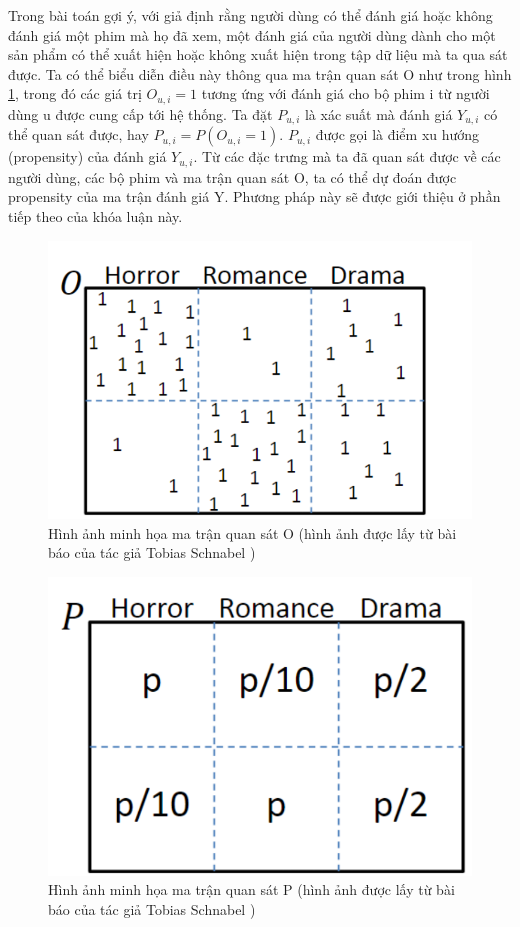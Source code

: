 Trong bài toán gợi ý, với giả định rằng người dùng có thể đánh giá hoặc không đánh giá một phim mà họ đã xem, một đánh giá của người dùng dành cho một sản phẩm có thể xuất hiện hoặc không xuất hiện trong tập dữ liệu mà ta qua sát được. Ta có thể biểu diễn điều này thông qua ma trận quan sát O như trong hình \ref{fig:3.1_O}, trong đó các giá trị $O_{u,i}=1$ tương ứng với đánh giá cho bộ phim i từ người dùng u được cung cấp tới hệ thống. Ta đặt $P_{u,i}$ là xác suất mà đánh giá $Y_{u,i}$ có thể quan sát được, hay  $P_{u,i} = P(O_{u,i} = 1)$.  $P_{u,i}$ được gọi là điểm xu hướng (propensity) của đánh giá  $Y_{u,i}$. Từ các đặc trưng mà ta đã quan sát được về các người dùng, các bộ phim và ma trận quan sát O, ta có thể dự đoán được propensity của ma trận đánh giá Y. Phương pháp này sẽ được giới thiệu ở phần tiếp theo của khóa luận này.


\begin{figure}[h]
    \centering
    \includegraphics[width=\textwidth]{images/Chapter3/O.png}
    \caption{Hình ảnh minh họa ma trận quan sát O (hình ảnh được lấy từ bài báo của tác giả Tobias Schnabel \cite{IPS})}
    \label{fig:3.1_O}
\end{figure}

\begin{figure}[h]
    \centering
    \includegraphics[width=\textwidth]{images/Chapter3/P.png}
    \caption{Hình ảnh minh họa ma trận quan sát P (hình ảnh được lấy từ bài báo của tác giả Tobias Schnabel \cite{IPS})}
    \label{fig:3.1_P}
\end{figure}

